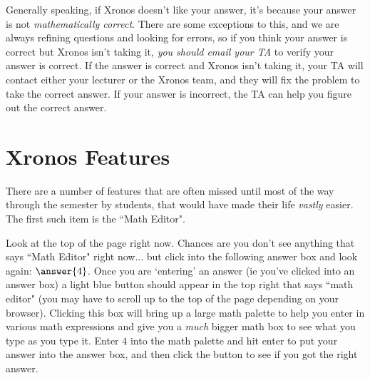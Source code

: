 \documentclass{ximera}
\begin{document}
    Generally speaking, if Xronos doesn't like your answer, it's because your answer is not \textit{mathematically correct}. There are some exceptions to this, and we are always refining questions and looking for errors, so if you think your answer is correct but Xronos isn't taking it, \textit{you should email your TA} to verify your answer is correct. If the answer is correct and Xronos isn't taking it, your TA will contact either your lecturer or the Xronos team, and they will fix the problem to take the correct answer. If your answer is incorrect, the TA can help you figure out the correct answer.

\section{Xronos Features}

    There are a number of features that are often missed until most of the way through the semester by students, that would have made their life \textit{vastly} easier. The first such item is the ``Math Editor".
    
    \begin{problem}
        Look at the top of the page right now. Chances are you don't see anything that says ``Math Editor" right now... but click into the following answer box and look again: $\answer{4}$. Once you are `entering' an answer (ie you've clicked into an answer box) a light blue button should appear in the top right that says ``math editor" (you may have to scroll up to the top of the page depending on your browser). Clicking this box will bring up a large math palette to help you enter in various math expressions and give you a \textit{much} bigger math box to see what you type as you type it. Enter $4$ into the math palette and hit enter to put your answer into the answer box, and then click the button to see if you got the right answer.
    \end{problem}
    
\end{document}
